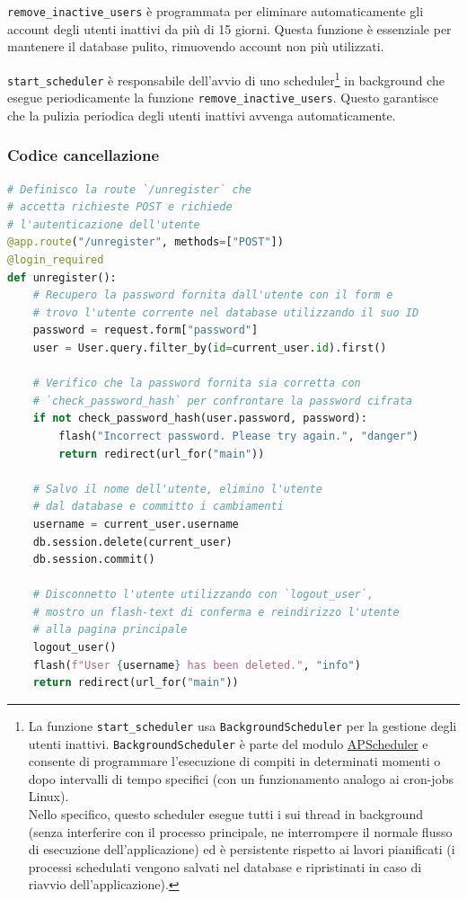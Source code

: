 \documentclass[12pt]{report}
\begin{document}
\texttt{remove\_inactive\_users} è programmata per eliminare automaticamente gli account degli utenti inattivi da più di 15 giorni. Questa funzione è essenziale per mantenere il database pulito, rimuovendo account non più utilizzati.

\texttt{start\_scheduler} è responsabile dell'avvio di uno scheduler\footnote{La funzione \texttt{start\_scheduler} usa \texttt{BackgroundScheduler} per la gestione degli utenti inattivi. \texttt{BackgroundScheduler} è parte del modulo \href{https://apscheduler.readthedocs.io/en/stable/}{\textsf{APScheduler}} e consente di programmare l'esecuzione di compiti in determinati momenti o dopo intervalli di tempo specifici (con un funzionamento analogo ai cron-jobs Linux).\\
Nello specifico, questo scheduler esegue tutti i sui thread in background (senza interferire con il processo principale, ne interrompere il normale flusso di esecuzione dell'applicazione) ed è persistente rispetto ai lavori pianificati (i processi schedulati vengono salvati nel database e ripristinati in caso di riavvio dell'applicazione).} in background che esegue periodicamente la funzione \texttt{remove\_inactive\_users}. Questo garantisce che la pulizia periodica degli utenti inattivi avvenga automaticamente.


\subsubsection{Codice cancellazione}
\begin{lstlisting}[language=Python]
# Definisco la route `/unregister` che
# accetta richieste POST e richiede
# l'autenticazione dell'utente
@app.route("/unregister", methods=["POST"])
@login_required
def unregister():
    # Recupero la password fornita dall'utente con il form e
    # trovo l'utente corrente nel database utilizzando il suo ID
    password = request.form["password"]
    user = User.query.filter_by(id=current_user.id).first()

    # Verifico che la password fornita sia corretta con
    # `check_password_hash` per confrontare la password cifrata
    if not check_password_hash(user.password, password):
        flash("Incorrect password. Please try again.", "danger")
        return redirect(url_for("main"))

    # Salvo il nome dell'utente, elimino l'utente
    # dal database e committo i cambiamenti
    username = current_user.username
    db.session.delete(current_user)
    db.session.commit()

    # Disconnetto l'utente utilizzando con `logout_user`,
    # mostro un flash-text di conferma e reindirizzo l'utente
    # alla pagina principale
    logout_user()
    flash(f"User {username} has been deleted.", "info")
    return redirect(url_for("main"))
\end{lstlisting}
\end{document}
